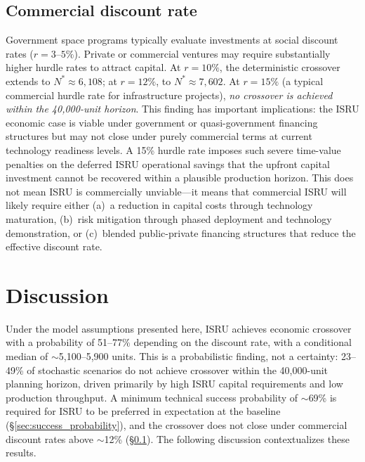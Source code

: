 \documentclass[preprint,12pt]{elsarticle}
\begin{document}
\subsection{Commercial discount rate}
\label{sec:commercial_rate}

Government space programs typically evaluate investments at social discount rates ($r = 3$--$5\%$). Private or commercial ventures may require substantially higher hurdle rates to attract capital. At $r = 10\%$, the deterministic crossover extends to $N^* \approx 6{,}108$; at $r = 12\%$, to $N^* \approx 7{,}602$. At $r = 15\%$ (a typical commercial hurdle rate for infrastructure projects), \emph{no crossover is achieved within the 40{,}000-unit horizon}. This finding has important implications: the ISRU economic case is viable under government or quasi-government financing structures but may not close under purely commercial terms at current technology readiness levels. A 15\% hurdle rate imposes such severe time-value penalties on the deferred ISRU operational savings that the upfront capital investment cannot be recovered within a plausible production horizon. This does not mean ISRU is commercially unviable---it means that commercial ISRU will likely require either (a)~a reduction in capital costs through technology maturation, (b)~risk mitigation through phased deployment and technology demonstration, or (c)~blended public-private financing structures that reduce the effective discount rate.

\section{Discussion}
\label{sec:discussion}

Under the model assumptions presented here, ISRU achieves economic crossover with a probability of 51--77\% depending on the discount rate, with a conditional median of $\sim$5{,}100--5{,}900 units. This is a probabilistic finding, not a certainty: 23--49\% of stochastic scenarios do not achieve crossover within the 40{,}000-unit planning horizon, driven primarily by high ISRU capital requirements and low production throughput. A minimum technical success probability of $\sim$69\% is required for ISRU to be preferred in expectation at the baseline (\S\ref{sec:success_probability}), and the crossover does not close under commercial discount rates above $\sim$12\% (\S\ref{sec:commercial_rate}). The following discussion contextualizes these results.
\end{document}
